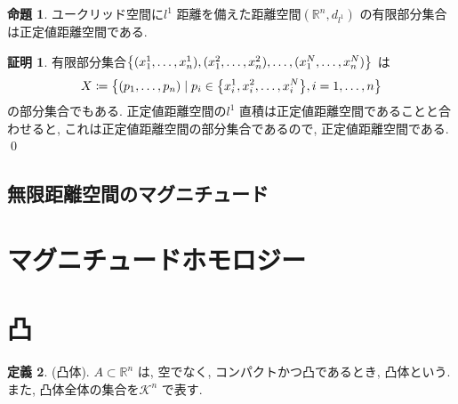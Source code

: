 \documentclass[10pt, fleqn, label-section=none]{bxjsarticle}
\theoremstyle{definition}
\newtheorem{dfn}{定義}[section]
\newtheorem{prop}[dfn]{命題}
\newtheorem*{pf*}{証明}
\newcommand{\cbra}[1]{\mleft\{#1\mright\}}
\renewcommand{\;}{\, ; \,}
\begin{document}
\begin{prop}ユークリッド空間に$l^1$ 距離を備えた距離空間$(\mathbb R^n, d_{l^1})$ の有限部分集合は正定値距離空間である. 

\end{prop}
\begin{pf*}
有限部分集合$\cbra{(x^1_1, \ldots, x^1_n)  , (x^2_1, \ldots, x^2_n), \ldots, (x^N_1, \ldots, x^N_n)}$ は
\begin{align*} X \coloneqq \cbra{(p_1, \ldots , p_n) \mid p_i \in \cbra{x^1_i, x^2_i, \ldots, x^N_i}, i = 1, \ldots, n } \end{align*}
の部分集合でもある. 正定値距離空間の$l^1$ 直積は正定値距離空間であることと合わせると, これは正定値距離空間の部分集合であるので, 正定値距離空間である. 
\qed
\end{pf*}













\subsection{無限距離空間のマグニチュード}

\section{マグニチュードホモロジー}




















\section{凸}

\begin{dfn}(凸体). $A \subset \mathbb R^n$ は, 空でなく, コンパクトかつ凸であるとき, 凸体という. また, 凸体全体の集合を$\mathcal K^n$ で表す.

\end{dfn}
\end{document}
